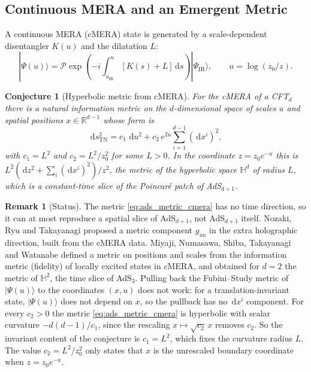 \documentclass[11pt,a4paper,reqno]{amsart}
\newtheorem{conjecture}[theorem]{Conjecture}
\theoremstyle{definition}
\newtheorem{remark}[theorem]{Remark}
\numberwithin{equation}{section}
\providecommand{\R}{\mathbb{R}}
\newcommand{\dif}{\,\mathrm{d}}
\begin{document}
\subsection{Continuous MERA and an Emergent Metric}
A continuous MERA (cMERA) state is generated by a scale-dependent disentangler $K(u)$ and the dilatation $L$:
\begin{equation}
    \label{eq:cmera_state}
    |\Psi(u)\rangle = \mathcal{P} \exp\left( -i \int_{u_{\mathrm{IR}}}^u [K(s) + L] \dif s \right) |\Psi_{\mathrm{IR}}\rangle, \qquad u = \log(z_0/z).
\end{equation}

\begin{conjecture}[Hyperbolic metric from cMERA]
\label{thm:tensor_network_metric}
For the cMERA of a CFT$_d$ there is a natural information metric on the $d$-dimensional space of scales $u$ and spatial positions $x \in \R^{d-1}$ whose form is
\begin{equation}
    \label{eq:ads_metric_cmera}
    \dif s_{\mathrm{TN}}^2 = c_1\,\dif u^2 + c_2\,e^{2u} \sum_{i=1}^{d-1} (\dif x^i)^2,
\end{equation}
with $c_1 = L^2$ and $c_2 = L^2/z_0^2$ for some $L > 0$. In the coordinate $z = z_0 e^{-u}$ this is $L^2(\dif z^2 + \sum_i (\dif x^i)^2)/z^2$, the metric of the hyperbolic space $\mathbb{H}^d$ of radius $L$, which is a constant-time slice of the Poincar\'e patch of AdS$_{d+1}$.
\end{conjecture}

\begin{remark}[Status]
The metric \eqref{eq:ads_metric_cmera} has no time direction, so it can at most reproduce a spatial slice of AdS$_{d+1}$, not AdS$_{d+1}$ itself. Nozaki, Ryu and Takayanagi \cite{nozaki2012holographic} proposed a metric component $g_{uu}$ in the extra holographic direction, built from the cMERA data. Miyaji, Numasawa, Shiba, Takayanagi and Watanabe \cite{miyaji2015cmera} defined a metric on positions and scales from the information metric (fidelity) of locally excited states in cMERA, and obtained for $d = 2$ the metric of $\mathbb{H}^2$, the time slice of AdS$_3$. Pulling back the Fubini--Study metric of $|\Psi(u)\rangle$ to the coordinates $(x, u)$ does not work: for a translation-invariant state, $|\Psi(u)\rangle$ does not depend on $x$, so the pullback has no $\dif x^i$ component. For every $c_2 > 0$ the metric \eqref{eq:ads_metric_cmera} is hyperbolic with scalar curvature $-d(d-1)/c_1$, since the rescaling $x \mapsto \sqrt{c_2}\,x$ removes $c_2$. So the invariant content of the conjecture is $c_1 = L^2$, which fixes the curvature radius $L$. The value $c_2 = L^2/z_0^2$ only states that $x$ is the unrescaled boundary coordinate when $z = z_0 e^{-u}$.
\end{remark}
\end{document}
